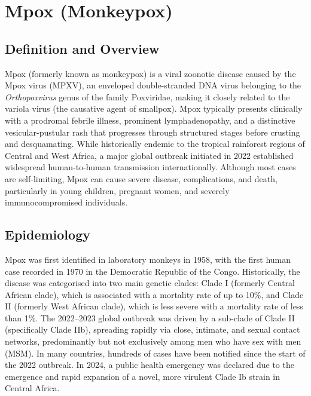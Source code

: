 \chapter{Mpox (Monkeypox)}

\section*{Definition and Overview}
Mpox (formerly known as monkeypox) is a viral zoonotic disease caused by the Mpox virus (MPXV), an enveloped double-stranded DNA virus belonging to the \textit{Orthopoxvirus} genus of the family Poxviridae, making it closely related to the variola virus (the causative agent of smallpox). Mpox typically presents clinically with a prodromal febrile illness, prominent lymphadenopathy, and a distinctive vesicular-pustular rash that progresses through structured stages before crusting and desquamating. While historically endemic to the tropical rainforest regions of Central and West Africa, a major global outbreak initiated in 2022 established widespread human-to-human transmission internationally. Although most cases are self-limiting, Mpox can cause severe disease, complications, and death, particularly in young children, pregnant women, and severely immunocompromised individuals.

\section*{Epidemiology}
Mpox was first identified in laboratory monkeys in 1958, with the first human case recorded in 1970 in the Democratic Republic of the Congo. Historically, the disease was categorised into two main genetic clades: Clade I (formerly Central African clade), which is associated with a mortality rate of up to 10\%, and Clade II (formerly West African clade), which is less severe with a mortality rate of less than 1\%. The 2022--2023 global outbreak was driven by a sub-clade of Clade II (specifically Clade IIb), spreading rapidly via close, intimate, and sexual contact networks, predominantly but not exclusively among men who have sex with men (MSM). In many countries, hundreds of cases have been notified since the start of the 2022 outbreak. In 2024, a public health emergency was declared due to the emergence and rapid expansion of a novel, more virulent Clade Ib strain in Central Africa.

